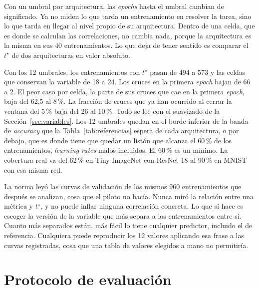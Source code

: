 Con un umbral por arquitectura, las \emph{epochs} hasta el umbral cambian de significado. Ya no miden lo que tarda un entrenamiento en resolver la tarea, sino lo que tarda en llegar al nivel propio de su arquitectura. Dentro de una celda, que es donde se calculan las correlaciones, no cambia nada, porque la arquitectura es la misma en sus 40 entrenamientos. Lo que deja de tener sentido es comparar el $t^\star$ de dos arquitecturas en valor absoluto.

Con los 12 umbrales, los entrenamientos con $t^\star$ pasan de 494 a 573 y las celdas que conservan la variable de 18 a 24. Los cruces en la primera \emph{epoch} bajan de 66 a 2. El peor caso por celda, la parte de sus cruces que cae en la primera \emph{epoch}, baja del 62,5 al 8\,\%. La fracción de cruces que ya han ocurrido al cerrar la ventana del 5\,\% baja del 26 al 10\,\%. Todo se lee con el suavizado de la Sección~\ref{sec:variables}. Los 12 umbrales quedan en el borde inferior de la banda de \emph{accuracy} que la Tabla~\ref{tab:referencias} espera de cada arquitectura, o por debajo, que es donde tiene que quedar un listón que alcanza el 60\,\% de los entrenamientos, \emph{learning rates} malos incluidos. El 60\,\% es un mínimo. La cobertura real va del 62\,\% en Tiny-ImageNet con ResNet-18 al 90\,\% en MNIST con esa misma red.

La norma leyó las curvas de validación de los mismos 960 entrenamientos que después se analizan, cosa que el piloto no hacía. Nunca miró la relación entre una métrica y $t^\star$, y no puede inflar ninguna correlación concreta. Lo que sí hace es escoger la versión de la variable que más separa a los entrenamientos entre sí. Cuanto más separados están, más fácil lo tiene cualquier predictor, incluido el de referencia. Cualquiera puede reproducir los 12 valores aplicando esa frase a las curvas registradas, cosa que una tabla de valores elegidos a mano no permitiría.

\section{Protocolo de evaluación}
\label{sec:protocolo-eval}

